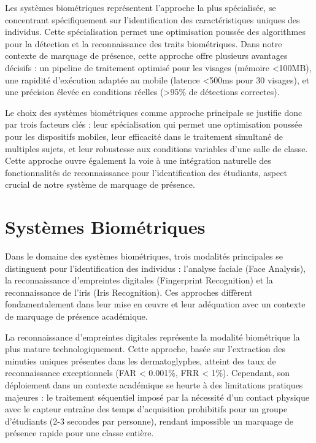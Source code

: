 \begin{onehalfspace}
\hspace{0.65cm}Les systèmes biométriques représentent l'approche la plus spécialisée, se concentrant spécifiquement sur l'identification des caractéristiques uniques des individus. Cette spécialisation permet une optimisation poussée des algorithmes pour la détection et la reconnaissance des traits biométriques. Dans notre contexte de marquage de présence, cette approche offre plusieurs avantages décisifs : un pipeline de traitement optimisé pour les visages (mémoire <100MB), une rapidité d'exécution adaptée au mobile (latence <500ms pour 30 visages), et une précision élevée en conditions réelles (>95\% de détections correctes).

\hspace{0.65cm}Le choix des systèmes biométriques comme approche principale se justifie donc par trois facteurs clés : leur spécialisation qui permet une optimisation poussée pour les dispositifs mobiles, leur efficacité dans le traitement simultané de multiples sujets, et leur robustesse aux conditions variables d'une salle de classe. Cette approche ouvre également la voie à une intégration naturelle des fonctionnalités de reconnaissance pour l'identification des étudiants, aspect crucial de notre système de marquage de présence.



\section{Systèmes Biométriques}
\hspace{0.65cm} Dans le domaine des systèmes biométriques, trois modalités principales se distinguent pour l'identification des individus : l'analyse faciale (Face Analysis), la reconnaissance d'empreintes digitales (Fingerprint Recognition) et la reconnaissance de l'iris (Iris Recognition). Ces approches diffèrent fondamentalement dans leur mise en œuvre et leur adéquation avec un contexte de marquage de présence académique.

\hspace{0.65cm} La reconnaissance d'empreintes digitales représente la modalité biométrique la plus mature technologiquement. Cette approche, basée sur l'extraction des minuties uniques présentes dans les dermatoglyphes, atteint des taux de reconnaissance exceptionnels (FAR < 0.001\%, FRR < 1\%). Cependant, son déploiement dans un contexte académique se heurte à des limitations pratiques majeures : le traitement séquentiel imposé par la nécessité d'un contact physique avec le capteur entraîne des temps d'acquisition prohibitifs pour un groupe d'étudiants (2-3 secondes par personne), rendant impossible un marquage de présence rapide pour une classe entière.


\end{onehalfspace}
